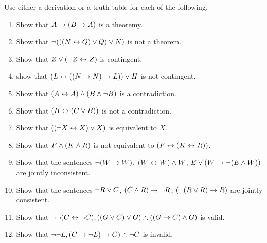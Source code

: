 \noindent\problempart Use either a derivation or a truth table for each of the following. 
\begin{enumerate}%
\item Show that $A \rightarrow (B \rightarrow A)$ is a theoremy.
\item Show that $\neg (((N \leftrightarrow Q) \vee Q) \vee N)$ is not a theorem.
\item Show that $ Z \vee (\neg Z \leftrightarrow Z) $ is contingent.
\item show that $ (L \leftrightarrow ((N \rightarrow N) \rightarrow L)) \vee H $ is not contingent.
\item Show that $ (A \leftrightarrow A) \wedge (B \wedge \neg B)$ is a contradiction.
\item Show that $ (B \leftrightarrow (C \vee B)) $ is not a contradiction.
\item Show that $ ((\neg X \leftrightarrow X) \vee X) $ is equivalent to $X$.
\item Show that $F \wedge (K \wedge R) $ is not equivalent to $ (F \leftrightarrow (K \leftrightarrow R)) $.
\item Show that the sentences $ \neg (W \rightarrow W)$, $(W \leftrightarrow W) \wedge W$, $E \vee (W \rightarrow \neg (E \wedge W))$ are jointly inconsistent.
\item Show that the sentences  $\neg R \vee C $, $(C \wedge R) \rightarrow \neg R$, $(\neg (R \vee R) \rightarrow R) $ are jointly consistent.
\item Show that $\enot \enot (C \eiff \enot C), ((G \eor C) \eor G) \therefore ((G \eif C) \eand G) $ is valid.
\item Show that $ \enot \enot L,  (C \eif \enot L) \eif C) \therefore \enot C$ is invalid. 
\end{enumerate}

